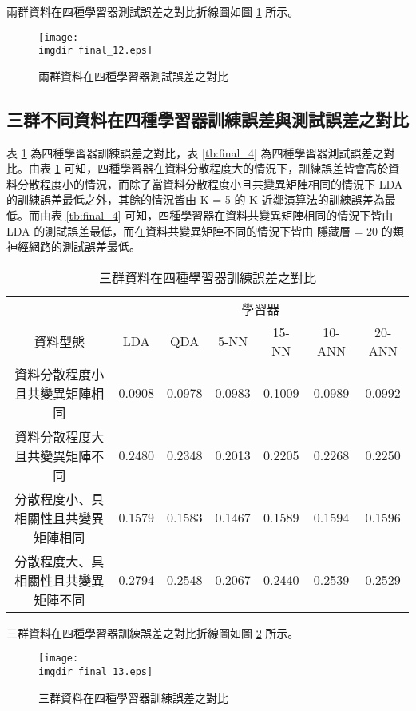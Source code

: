 \newpage 
兩群資料在四種學習器測試誤差之對比折線圖如圖 \ref{fig:final_12} 所示。
\begin{figure}[H]
    \centering
        \texttt{[image: \\imgdir final\_12.eps]}
    \caption{兩群資料在四種學習器測試誤差之對比}
    \label{fig:final_12}
\end{figure}
\subsection{三群不同資料在四種學習器訓練誤差與測試誤差之對比}
表 \ref{tb:final_3} 為四種學習器訓練誤差之對比，表 \ref{tb:final_4} 為四種學習器測試誤差之對比。由表 \ref{tb:final_3} 可知，四種學習器在資料分散程度大的情況下，訓練誤差皆會高於資料分散程度小的情況，而除了當資料分散程度小且共變異矩陣相同的情況下 LDA 的訓練誤差最低之外，其餘的情況皆由 K = 5 的 K-近鄰演算法的訓練誤差為最低。而由表 \ref{tb:final_4} 可知，四種學習器在資料共變異矩陣相同的情況下皆由 LDA 的測試誤差最低，而在資料共變異矩陣不同的情況下皆由 隱藏層 = 20 的類神經網路的測試誤差最低。
\bigskip
\begin{table}[H] 
\centering
\caption{三群資料在四種學習器訓練誤差之對比}\label{tb:final_3}
\tabcolsep=2pt
\begin{tabular}{ccccccc} 
\toprule
& \multicolumn{6}{c}{學習器}\\
\cmidrule(l){2-7}
資料型態 & LDA & QDA & 5-NN & 15-NN & 10-ANN & 20-ANN\\[3pt]
\midrule
資料分散程度小且共變異矩陣相同 & \cellcolor{red!25}0.0908 & 0.0978  & 0.0983 & 0.1009 & 0.0989 & 0.0992\\[3pt]
資料分散程度大且共變異矩陣不同 & 0.2480 & 0.2348 & \cellcolor{red!25}0.2013 & 0.2205 & 0.2268 & 0.2250\\[3pt]
分散程度小、具相關性且共變異矩陣相同 & 0.1579 &  0.1583 & \cellcolor{red!25}0.1467 & 0.1589  & 0.1594 & 0.1596\\ [3pt]
分散程度大、具相關性且共變異矩陣不同 & 0.2794 &  0.2548 & \cellcolor{red!25}0.2067 & 0.2440 & 0.2539 & 0.2529\\ 
\bottomrule
\end{tabular}
\end{table}
\newpage
三群資料在四種學習器訓練誤差之對比折線圖如圖 \ref{fig:final_13} 所示。
\begin{figure}[H]
    \centering
        \texttt{[image: \\imgdir final\_13.eps]}
    \caption{三群資料在四種學習器訓練誤差之對比}
    \label{fig:final_13}
\end{figure}
\bigskip
